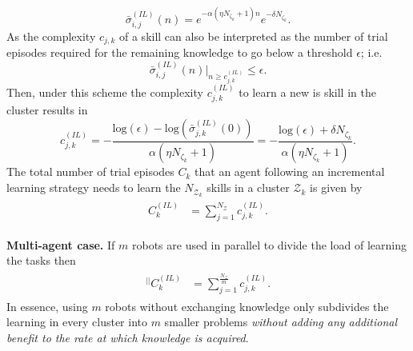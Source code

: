 \begin{equation*}\label{eq:remaining_knowledge__IL}
	\bar{\sigma}^{(IL)}_{i,j}(n) = e^{-\alpha  \left(\eta N_{\zeta_k}+1\right) n} e^{-\delta N_{\zeta_k}}.
\end{equation*}
As the complexity $c_{j,k}$ of a skill can also be interpreted as the number of trial episodes required for the remaining knowledge to go below a threshold $\epsilon$; i.e.
\begin{equation*}
	\bar{\sigma}^{(IL)}_{i,j}(n) \Big \rvert_{n \ge c^{(IL)}_{j,k}} \leq \epsilon.
\end{equation*}
Then, under this scheme the complexity $c^{(IL)}_{j,k}$ to learn a new is skill in the cluster results in
\begin{equation}\label{eq:complexity_IL}
	c^{(IL)}_{j,k} = -\frac{\text{log}(\epsilon) - \text{log}\left(\bar{\sigma}^{(IL)}_{j,k}(0)\right)}{\alpha (\eta N_{\zeta_k}+ 1)} = -\frac{\text{log}(\epsilon) + \delta N_{\zeta_k}}{\alpha (\eta N_{\zeta_k}+ 1)}  .
\end{equation}
The total number of trial episodes $ C_k $ that an agent following an incremental learning strategy needs to learn the $N_{\mathcal{Z}_k}$ skills in a cluster $ \mathcal{Z}_k $ is given by
\begin{align}\label{eq:total_episodes_incremental}
	\begin{split}
		C^{(IL)}_k &= \sum^{N_{\mathcal{Z}}}_{j=1} c^{(IL)}_{j,k}.
	\end{split}
\end{align}

\textbf{Multi-agent case.} If $m$ robots are used in parallel to divide the load of learning the tasks then
\begin{align}
	\begin{split}
		{}^{\lvert \rvert}C^{(IL)}_k &= \sum^{\frac{N_{\mathcal{Z}}}{m}}_{j=1} c^{(IL)}_{j,k}.
	\end{split}
\end{align}
In essence, using $m$ robots without exchanging knowledge only subdivides the learning in every cluster into $m$ smaller problems \emph{without adding any additional benefit to the rate at which knowledge is acquired}. 

